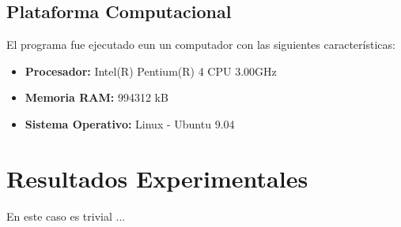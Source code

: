 \documentclass{report}
\begin{document}
\subsection{Plataforma Computacional}
El programa fue ejecutado eun un computador con las siguientes caracter\'isticas:
\begin{itemize}
\item {\bf Procesador:} Intel(R) Pentium(R) 4 CPU 3.00GHz
\item {\bf Memoria RAM:} 994312 kB
\item {\bf Sistema Operativo:} Linux - Ubuntu 9.04 
\end{itemize}
%
\section{Resultados Experimentales}
En este caso es trivial ...
%
\end{document}
